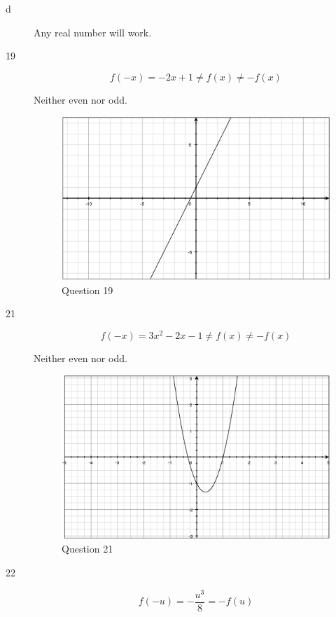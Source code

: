 \documentclass{exam}
\begin{document}
\begin{description}
\item[d]
Any real number will work.

\item[19]
\[
  f(-x) = -2x + 1 \neq f(x) \neq -f(x)
\]

Neither even nor odd.

\begin{figure}[H]
  \centering
  \includegraphics[scale=.3]{question_19.eps}
  \caption*{Question 19}
\end{figure}

\item[21]
\[
  f(-x) = 3x^2 -2x - 1 \neq f(x) \neq -f(x)
\]

Neither even nor odd.

\begin{figure}[H]
  \centering
  \includegraphics[scale=.3]{question_21.eps}
  \caption*{Question 21}
\end{figure}

\item[22]
\[
  f(-u) = -\frac{u^3}{8} = -f(u)
\]


\end{description}
\end{document}
